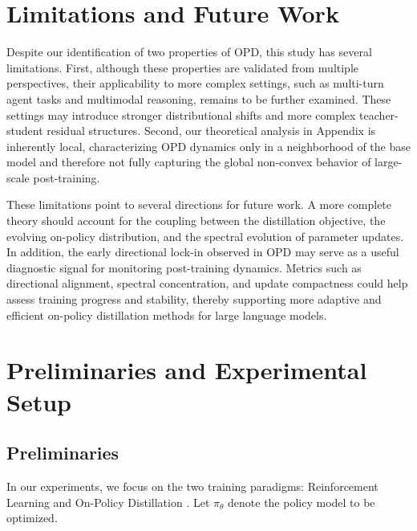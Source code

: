 \documentclass{llmxive}
\begin{document}
\section{Limitations and Future Work}
\label{Limitation}

Despite our identification of two properties of OPD, this study has several limitations. First, although these properties are validated from multiple perspectives, their applicability to more complex settings, such as multi-turn agent tasks and multimodal reasoning, remains to be further examined. These settings may introduce stronger distributional shifts and more complex teacher-student residual structures. Second, our theoretical analysis in Appendix is inherently local, characterizing OPD dynamics only in a neighborhood of the base model and therefore not fully capturing the global non-convex behavior of large-scale post-training.

These limitations point to several directions for future work. A more complete theory should account for the coupling between the distillation objective, the evolving on-policy distribution, and the spectral evolution of parameter updates. In addition, the early directional lock-in observed in OPD may serve as a useful diagnostic signal for monitoring post-training dynamics. Metrics such as directional alignment, spectral concentration, and update compactness could help assess training progress and stability, thereby supporting more adaptive and efficient on-policy distillation methods for large language models.





\section{Preliminaries and Experimental Setup}
\label{Preliminaries and Experimental Setup}

\subsection{Preliminaries}
In our experiments, we focus on the two training paradigms: Reinforcement Learning \citep{Zhang2025ASO} and On-Policy Distillation \citep{Kim2026WhyDS}. Let $\pi_{\theta}$ denote the policy model to be optimized.
\end{document}
